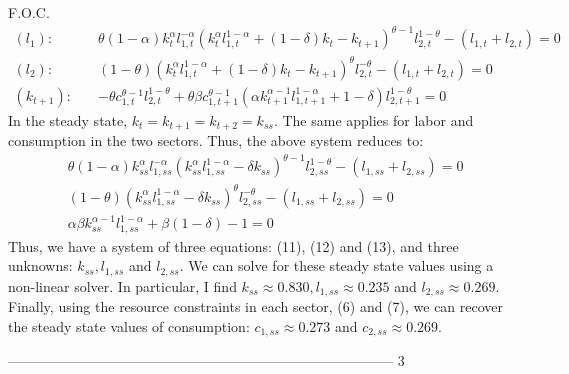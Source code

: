 \documentclass[11pt,a4paper]{article}
\begin{document}
F.O.C.
\begin{align}
(l_1): \quad  & \theta(1-\alpha) k_t^{\alpha} l_{1,t}^{-\alpha} \left(k_{t}^{\alpha}l_{1,t}^{1-\alpha} + (1-\delta) k_{t}- k_{t+1}\right)^{\theta-1}l_{2,t}^{1-\theta} - \left(l_{1,t} + l_{2,t}\right) = 0
\\
(l_2): \quad & (1-\theta)\left(k_{t}^{\alpha}l_{1,t}^{1-\alpha} + (1 - \delta) k_{t} - k_{t+1}\right)^{\theta}l_{2,t}^{-\theta} - \left(l_{1,t} + l_{2,t}\right) = 0 \\
(k_{t+1}): \quad &- \theta c_{1,t}^{\theta-1} l_{2,t}^{1-\theta} + \theta \beta c_{1,t+1}^{\theta-1} \left(\alpha k_{t+1}^{\alpha-1}l_{1,t+1}^{1-\alpha} + 1 - \delta \right)l_{2,t+1}^{1-\theta} = 0
\end{align}
In the steady state, $k_{t} = k_{t+1}=k_{t+2}=k_{ss}$. The same applies for labor and consumption in the two sectors. Thus, the above system reduces to:
\begin{align}
&\theta(1-\alpha) k_{ss}^{\alpha} l_{1,ss}^{-\alpha} \left(k_{ss}^{\alpha}l_{1,ss}^{1-\alpha}  - \delta k_{ss} \right)^{\theta-1}l_{2,ss}^{1-\theta} - \left(l_{1,ss} + l_{2,ss}\right) = 0
\\
&(1-\theta)\left(k_{ss}^{\alpha}l_{1,ss}^{1-\alpha}  - \delta k_{ss} \right)^{\theta}l_{2,ss}^{-\theta} - \left(l_{1,ss} + l_{2,ss}\right) = 0 \\
& \alpha\beta k_{ss}^{\alpha-1} l_{1,ss}^{1-\alpha} + \beta (1-\delta) - 1 = 0
\end{align}
Thus, we have a system of three equations: (11), (12) and (13), and three unknowns: $k_{ss}, l_{1,ss}$ and $l_{2,ss}$. We can solve for these steady state values using a non-linear solver. In particular, I find $k_{ss} \approx 0.830, l_{1,ss} \approx 0.235$ and $l_{2,ss} \approx 0.269$.
\\
Finally, using the resource constraints in each sector, (6) and (7), we can recover the steady state values of consumption: $c_{1,ss} \approx 0.273$ and $c_{2,ss} \approx 0.269$.


-----------------------------------------------------------------------------------
3
\end{document}
